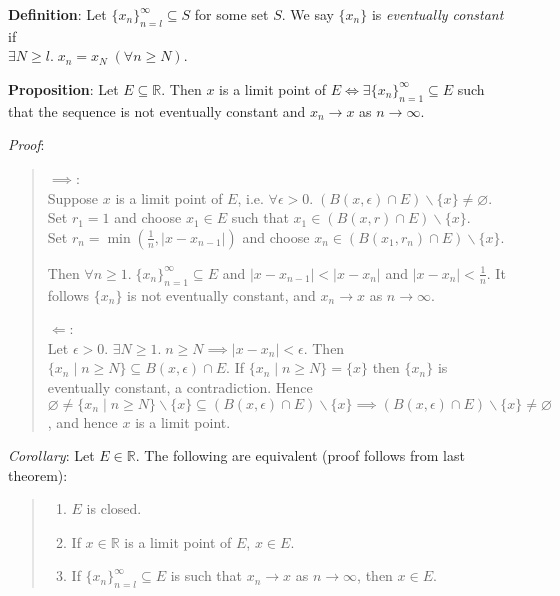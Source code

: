 \documentclass[11pt]{article}
\begin{document}
\textbf{Definition}: Let $\{x_n\}_{n=l}^\infty \subseteq S$ for some set $S$. We say $\{x_n\}$ is \emph{eventually constant} if\\
$\exists N \geq l.\; x_n = x_N\; (\forall n \geq N)$. 

\textbf{Proposition}: Let $E \subseteq \mathbb{R}$. Then $x$ is a limit point of $E \iff \exists \{x_n\}_{n=1}^\infty \subseteq E$ such that the sequence is not eventually constant and $x_n \to x$ as $n \to \infty$.

\emph{Proof}:
\begin{quote}\vspace{-0.3cm}
$\implies$:\\
Suppose $x$ is a limit point of $E$, i.e. $\forall \epsilon > 0.\; (B(x, \epsilon) \cap E) \backslash \{x\} \neq \varnothing$. Set $r_1 = 1$ and choose $x_1 \in E$ such that $x_1 \in (B(x, r) \cap E) \backslash \{x\}$.\\
Set $r_n = \min(\frac{1}{n}, |x-x_{n-1}|)$ and choose $x_n \in (B(x_1, r_n) \cap E) \backslash \{x\}$.

Then $\forall n \geq 1.\; \{x_n\}_{n=1}^\infty \subseteq E$ and $|x-x_{n-1}| < |x-x_n|$ and $|x-x_n| < \frac{1}{n}$. It follows $\{x_n\}$ is not eventually constant, and $x_n \to x$ as $n \to \infty$.

$\Longleftarrow$:\\
Let $\epsilon > 0$. $\exists N \geq 1.\; n \geq N \implies |x-x_n| < \epsilon$. Then $\{x_n \;|\; n \geq N\} \subseteq B(x, \epsilon) \cap E$. If $\{x_n \;|\; n \geq N\} = \{x\}$ then $\{x_n\}$ is eventually constant, a contradiction. Hence $\varnothing \neq \{x_n \;|\; n \geq N\} \backslash \{x\} \subseteq (B(x, \epsilon) \cap E) \backslash \{x\} \implies (B(x, \epsilon) \cap E) \backslash \{x\} \neq \varnothing$, and hence $x$ is a limit point.
\end{quote}

\emph{Corollary}: Let $E \in \mathbb{R}$. The following are equivalent (proof follows from last theorem):
\begin{quote}\vspace{-0.3cm}
	\begin{enumerate}
	\item $E$ is closed.
	\item If $x \in \mathbb{R}$ is a limit point of $E$, $x \in E$.
	\item If $\{x_n\}_{n=l}^\infty \subseteq E$ is such that $x_n \to x$ as $n \to \infty$, then $x \in E$.
	\end{enumerate}
\end{quote}
\end{document}
